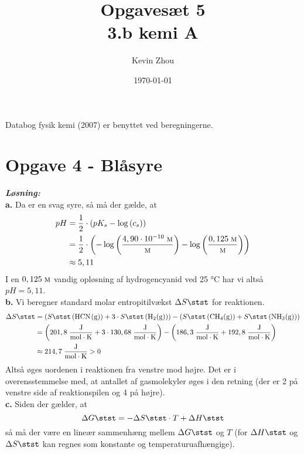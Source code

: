 \documentclass{report}
\title{Opgavesæt 5\\
{\Large \textbf{3.b kemi A}}}
\author{Kevin Zhou}
\date{\today}
\newcommand{\sol}{\setlength{\parindent}{0cm}\textbf{\textit{Løsning:}}\setlength{\parindent}{1cm}}
\begin{document}
\maketitle
\begin{note}
  Databog fysik kemi (2007) er benyttet ved beregningerne.
\end{note}
\section*{Opgave 4 - Blåsyre}
\sol \\
\textbf{a.}
Da  er en svag syre, så må der gælde, at 
\begin{equation*}
\begin{split}
  pH&=\frac{1}{2} \cdot \left(pK_s - \log\left(c_s\right) \right) \\
  &=\frac{1}{2} \cdot \left(-\log\left(\frac{4,90 \cdot 10 ^{-10}\;\unit{\textsc{m}}}{\unit{\textsc{m}} }  \right) - \log\left(\frac{0,125 \;\unit{\textsc{m}}}{\unit{\textsc{m}} } \right)\right) \\
  &\approx 5,11
\end{split}
\end{equation*}
I en $0,125 \;\unit{\textsc{m}} $ vandig opløsning af hydrogencyanid ved 25 °C har vi altså $pH=5,11$.\\[1ex]
\textbf{b.}
Vi beregner standard molar entropitilvækst $\Delta S \stst $ for reaktionen. 
\begin{equation*}
\begin{split}
  \Delta S \stst &= \left(S \stst \left(\ce{HCN(g)} \right) + 3 \cdot S \stst \left(\ce{H2(g)} \right) \right)  -\left(S \stst \left(\ce{CH4(g)}\right)  + S \stst \left(\ce{NH3(g)} \right) \right)\\
  &=\left(201,8 \;\unit{\frac{J}{mol \cdot K}} +3 \cdot 130,68 \;\unit{\frac{J}{mol \cdot K}}  \right) - \left(186,3 \;\unit{\frac{J}{mol \cdot K}} + 192,8 \;\unit{\frac{J}{mol \cdot K}} \right) \\
  &\approx 214,7 \;\unit{\frac{J}{mol \cdot K}} >0
\end{split}
\end{equation*}
Altså øges uordenen i reaktionen fra venstre mod højre.
Det er i overensstemmelse med, at antallet af gasmolekyler øges i den retning (der er 2 på venstre side af reaktionspilen og 4 på højre). \\[1ex]
\textbf{c.}
Siden der gælder, at 
\[
\Delta G \stst =-\Delta S \stst \cdot T+ \Delta H \stst 
\] 
så må der være en lineær sammenhæng mellem $\Delta G \stst $ og $T$ (for $\Delta H \stst $ og $\Delta S \stst $ kan regnes som konstante og temperaturuafhængige). 
\end{document}
